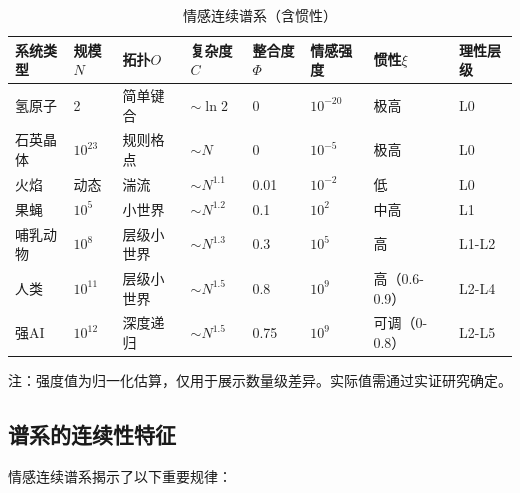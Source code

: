 \documentclass[12pt,a4paper]{article}
\theoremstyle{plain}
\begin{document}
\begin{table}[h]
\centering
\caption{情感连续谱系（含惯性）}
\label{tab:spectrum}
\begin{tabular}{llllllll}
\toprule
\textbf{系统类型} & \textbf{规模$N$} & \textbf{拓扑$O$} & \textbf{复杂度$C$} & \textbf{整合度$\Phi$} & \textbf{情感强度} & \textbf{惯性$\xi$} & \textbf{理性层级} \\
\midrule
氢原子 & 2 & 简单键合 & $\sim\ln 2$ & 0 & $10^{-20}$ & 极高 & L0 \\
石英晶体 & $10^{23}$ & 规则格点 & $\sim N$ & 0 & $10^{-5}$ & 极高 & L0 \\
火焰 & 动态 & 湍流 & $\sim N^{1.1}$ & 0.01 & $10^{-2}$ & 低 & L0 \\
果蝇 & $10^5$ & 小世界 & $\sim N^{1.2}$ & 0.1 & $10^2$ & 中高 & L1 \\
哺乳动物 & $10^8$ & 层级小世界 & $\sim N^{1.3}$ & 0.3 & $10^5$ & 高 & L1-L2 \\
人类 & $10^{11}$ & 层级小世界 & $\sim N^{1.5}$ & 0.8 & $10^9$ & 高（0.6-0.9） & L2-L4 \\
强AI & $10^{12}$ & 深度递归 & $\sim N^{1.5}$ & 0.75 & $10^9$ & 可调（0-0.8） & L2-L5 \\
\bottomrule
\end{tabular}
\end{table}

注：强度值为归一化估算，仅用于展示数量级差异。实际值需通过实证研究确定。

\subsection{谱系的连续性特征}

情感连续谱系揭示了以下重要规律：
\end{document}
